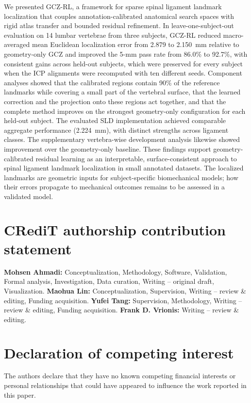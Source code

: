 \documentclass[5p,times,twocolumn,authoryear]{elsarticle}
\newif\ifhighlight
\newcommand{\rev}[1]{\ifhighlight{\color{revcolor}#1}\else#1\fi}
\begin{document}
We presented GCZ-RL, a framework for sparse spinal ligament landmark \rev{localization} that couples annotation-calibrated anatomical search spaces with rigid atlas transfer and bounded residual refinement. In leave-one-subject-out evaluation on 14 lumbar vertebrae from three subjects, GCZ-RL reduced macro-averaged mean Euclidean localization error from 2.879 to 2.150~mm relative to geometry-only GCZ and improved the 5-mm pass rate from 86.0\% to 92.7\%, with consistent gains across held-out subjects\rev{, which were preserved for every subject when the ICP alignments were recomputed with ten different seeds}. \rev{Component analyses showed that the calibrated regions contain 90\% of the reference landmarks while covering a small part of the vertebral surface, that the learned correction and the projection onto these regions act together, and that the complete method improves on the strongest geometry-only configuration for each held-out subject.} The evaluated SLD implementation achieved comparable aggregate performance (2.224~mm), with distinct strengths across ligament classes. The supplementary vertebra-wise development analysis likewise showed improvement over the geometry-only baseline. These findings support geometry-calibrated residual learning as an interpretable, surface-consistent approach to spinal ligament landmark localization in small annotated datasets. \rev{The localized landmarks are geometric inputs for subject-specific biomechanical models; how their errors propagate to mechanical outcomes remains to be assessed in a validated model.}

\section*{CRediT authorship contribution statement}
\textbf{Mohsen Ahmadi:} Conceptualization, Methodology, Software, Validation, Formal analysis, Investigation, Data curation, Writing -- original draft, Visualization.
\textbf{Maohua Lin:} Conceptualization, Supervision, Writing -- review \& editing, Funding acquisition.
\textbf{Yufei Tang:} Supervision, Methodology, Writing -- review \& editing, Funding acquisition.
\textbf{Frank D. Vrionis:} Writing -- review \& editing. %

\section*{Declaration of competing interest}
The authors declare that they have no known competing financial interests or personal relationships that could have appeared to influence the work reported in this paper.
\end{document}

